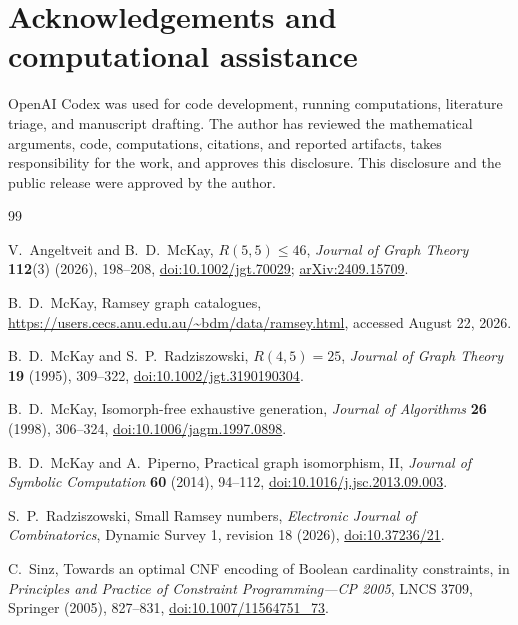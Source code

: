 \documentclass[10pt]{article}
\theoremstyle{definition}
\theoremstyle{remark}
\begin{document}
\section*{Acknowledgements and computational assistance}

OpenAI Codex was used for code development, running computations,
literature triage, and manuscript drafting.  The author has reviewed the
mathematical arguments, code, computations, citations, and reported artifacts,
takes responsibility for the work, and approves this disclosure.  This
disclosure and the public release were approved by the author.

\begin{thebibliography}{99}
\setlength{\itemsep}{3pt}

V.~Angeltveit and B.~D.~McKay,
\newblock $R(5,5)\leq46$,
\newblock \emph{Journal of Graph Theory} \textbf{112}(3) (2026), 198--208,
\newblock \href{https://doi.org/10.1002/jgt.70029}{doi:10.1002/jgt.70029};
\href{https://arxiv.org/abs/2409.15709}{arXiv:2409.15709}.

B.~D.~McKay,
\newblock Ramsey graph catalogues,
\newblock \url{https://users.cecs.anu.edu.au/~bdm/data/ramsey.html},
accessed August 22, 2026.

B.~D.~McKay and S.~P.~Radziszowski,
\newblock $R(4,5)=25$,
\newblock \emph{Journal of Graph Theory} \textbf{19} (1995), 309--322,
\newblock \href{https://doi.org/10.1002/jgt.3190190304}{doi:10.1002/jgt.3190190304}.

B.~D.~McKay,
\newblock Isomorph-free exhaustive generation,
\newblock \emph{Journal of Algorithms} \textbf{26} (1998), 306--324,
\newblock \href{https://doi.org/10.1006/jagm.1997.0898}{doi:10.1006/jagm.1997.0898}.

B.~D.~McKay and A.~Piperno,
\newblock Practical graph isomorphism, II,
\newblock \emph{Journal of Symbolic Computation} \textbf{60} (2014),
94--112,
\newblock \href{https://doi.org/10.1016/j.jsc.2013.09.003}{doi:10.1016/j.jsc.2013.09.003}.

S.~P.~Radziszowski,
\newblock Small Ramsey numbers,
\newblock \emph{Electronic Journal of Combinatorics}, Dynamic Survey 1,
revision 18 (2026),
\newblock \href{https://doi.org/10.37236/21}{doi:10.37236/21}.

C.~Sinz,
\newblock Towards an optimal CNF encoding of Boolean cardinality constraints,
\newblock in \emph{Principles and Practice of Constraint Programming---CP
2005}, LNCS 3709, Springer (2005), 827--831,
\newblock \href{https://doi.org/10.1007/11564751_73}{doi:10.1007/11564751\_73}.


\end{thebibliography}
\end{document}
